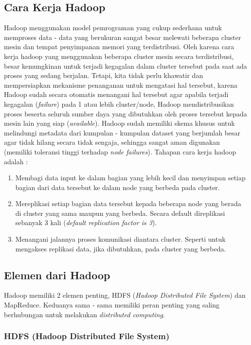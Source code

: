 	\subsection{Cara Kerja Hadoop}
	Hadoop menggunakan model pemrograman yang cukup sederhana untuk memproses data - data yang berukuran sangat besar melewati beberapa cluster mesin dan tempat penyimpanan memori yang terdistribusi. Oleh karena cara kerja hadoop yang menggunakan beberapa cluster mesin secara terdistribusi, besar kemungkinan untuk terjadi kegagalan dalam cluster tersebut pada saat ada proses yang sedang berjalan. Tetapi, kita tidak perlu khawatir dan mempersiapkan mekanisme penanganan untuk mengatasi hal tersebut, karena Hadoop sudah secara otomatis menangani hal tersebut agar apabila terjadi kegagalan (\textit{failure}) pada 1 atau lebih cluster/node, Hadoop mendistribusikan proses beserta seluruh sumber daya yang dibutuhkan oleh proses tersebut kepada mesin lain yang siap (\textit{available}). Hadoop sudah memiliki skema khusus untuk melindungi metadata dari kumpulan - kumpulan dataset yang berjumlah besar agar tidak hilang secara tidak sengaja, sehingga sangat aman digunakan (memiliki toleransi tinggi terhadap \textit{node failures}). Tahapan cara kerja hadoop adalah \cite{Holmes:2012:HP:2543981} : 
	\begin{enumerate}
		\item Membagi data input ke dalam bagian yang lebih kecil dan menyimpan setiap bagian dari data tersebut ke dalam node yang berbeda pada cluster.
		\item Mereplikasi setiap bagian data tersebut kepada beberapa node yang berada di cluster yang sama maupun yang berbeda. Secara default direplikasi sebanyak 3 kali (\textit{default replication factor is 3}).
		\item Menangani jalannya proses komunikasi diantara cluster. Seperti untuk mengakses replikasi data, jika dibutuhkan, pada cluster yang berbeda.
	\end{enumerate}
	\subsection{Elemen dari Hadoop}
	Hadoop memiliki 2 elemen penting, HDFS (\textit{Hadoop Distributed File System}) dan MapReduce. Keduanya sama - sama memiliki peran penting yang saling berhubungan untuk melakukan \textit{distributed computing}.
		\subsubsection{HDFS (Hadoop Distributed File System)}


